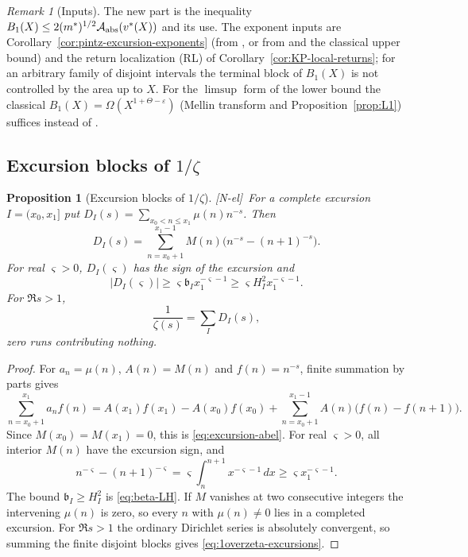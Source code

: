 \documentclass[11pt,reqno]{amsart}
\numberwithin{equation}{section}
\theoremstyle{plain}
\newtheorem{proposition}[theorem]{Proposition}
\theoremstyle{definition}
\theoremstyle{remark}
\newtheorem{remark}[theorem]{Remark}
\newcommand{\eps}{\varepsilon}
\newcommand{\tagNE}{\textup{[N-el]}}
\begin{document}
\begin{remark}[Inputs]
The new part is the inequality $B_1(X)\le2(m^*)^{1/2}\mathcal A_{\rm abs}(v^*(X))$
and its use. The exponent inputs are Corollary~\ref{cor:pintz-excursion-exponents}
(from \cite{Pintz2026}, or from \cite{Pintz1983} and the classical upper bound)
and the return localization (RL) of Corollary~\ref{cor:KP-local-returns}; for an arbitrary family of disjoint
intervals the terminal block of $B_1(X)$ is not controlled by the area up to
$X$. For the $\limsup$ form of the lower bound the classical
$B_1(X)=\Omega(X^{1+\Theta-\eps})$ (Mellin transform and
Proposition~\ref{prop:L1}) suffices instead of \cite{Pintz2026}.
\end{remark}


\subsection{\texorpdfstring{Excursion blocks of $1/\zeta$}{Excursion blocks of 1/zeta}}

\begin{proposition}[Excursion blocks of $1/\zeta$]
\label{prop:excursion-mellin}
\tagNE\ For a complete excursion $I=(x_0,x_1]$ put
$D_I(s)=\sum_{x_0<n\le x_1}\mu(n)n^{-s}$. Then
\begin{equation}
\label{eq:excursion-abel}
D_I(s)=\sum_{n=x_0+1}^{x_1-1}M(n)
\bigl(n^{-s}-(n+1)^{-s}\bigr).
\end{equation}
For real $\varsigma>0$, $D_I(\varsigma)$ has the sign of the excursion and
\begin{equation}
\label{eq:excursion-mass-lower}
|D_I(\varsigma)|\ge
\varsigma\mathfrak b_I x_1^{-\varsigma-1}
\ge\varsigma H_I^2x_1^{-\varsigma-1}.
\end{equation}
For $\Re s>1$,
\begin{equation}
\label{eq:1overzeta-excursions}
\frac1{\zeta(s)}=\sum_I D_I(s),
\end{equation}
zero runs contributing nothing.
\end{proposition}

\begin{proof}
For $a_n=\mu(n)$, $A(n)=M(n)$ and $f(n)=n^{-s}$, finite summation by
parts gives
\begin{equation}
 \sum_{n=x_0+1}^{x_1}a_nf(n)
 =A(x_1)f(x_1)-A(x_0)f(x_0)
 +\sum_{n=x_0+1}^{x_1-1}A(n)\bigl(f(n)-f(n+1)\bigr).
\end{equation}
Since $M(x_0)=M(x_1)=0$, this is \eqref{eq:excursion-abel}.  For real
$\varsigma>0$, all interior $M(n)$ have the excursion sign, and
\begin{equation}
 n^{-\varsigma}-(n+1)^{-\varsigma}
 =\varsigma\int_n^{n+1}x^{-\varsigma-1}\,dx
 \ge\varsigma x_1^{-\varsigma-1}.
\end{equation}
The bound $\mathfrak b_I\ge H_I^2$ is \eqref{eq:beta-LH}.  If $M$ vanishes at
two consecutive integers the intervening $\mu(n)$ is zero, so every
$n$ with $\mu(n)\ne0$ lies in a completed excursion.  For $\Re s>1$
the ordinary Dirichlet series is absolutely convergent, so summing the
finite disjoint blocks gives \eqref{eq:1overzeta-excursions}.
\end{proof}
\end{document}
